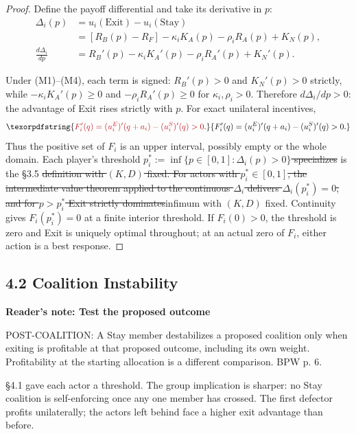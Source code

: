 \documentclass[12pt]{article}
\theoremstyle{definition}
\theoremstyle{remark}
\providecommand{\DIFaddtex}[1]{{\color{AddedText}#1}}
\providecommand{\DIFdeltex}[1]{{\color{DeletedText}\sout{#1}}}
\providecommand{\DIFaddbegin}{}
\providecommand{\DIFaddend}{}
\providecommand{\DIFdelbegin}{}
\providecommand{\DIFdelend}{}
\newcommand{\ReviewNote}[2]{\par\begin{mdframed}[backgroundcolor=blue!3,linecolor=NoteText,linewidth=0.6pt]\color{NoteText}\small\textbf{Reader's note: #1}\par #2\end{mdframed}\par}
\providecommand{\DIFadd}[1]{\texorpdfstring{\DIFaddtex{#1}}{#1}} %
\providecommand{\DIFdel}[1]{\texorpdfstring{\DIFdeltex{#1}}{}} %
\begin{document}
\begin{proof}
Define the payoff differential and take its derivative in $p$:
\begin{align*}
\Delta_i(p) &= u_i(\text{Exit}) - u_i(\text{Stay}) \\
            &= [R_B(p) - R_F] - \kappa_i K_A(p) - \rho_i R_A(p) + K_N(p), \\
\frac{d\Delta_i}{dp} &= R_B'(p) - \kappa_i K_A'(p) - \rho_i R_A'(p) + K_N'(p).
\end{align*}

Under (M1)--(M4), each term is signed: $R_B'(p) > 0$ and $K_N'(p) > 0$ strictly, while $-\kappa_i K_A'(p) \geq 0$ and $-\rho_i R_A'(p) \geq 0$ for $\kappa_i, \rho_i > 0$. Therefore $d\Delta_i/dp > 0$: the advantage of Exit rises strictly with $p$. \DIFaddbegin \DIFadd{For exact unilateral incentives,
}\[
 \DIFadd{F_i'(q)=(u_i^E)'(q+a_i)-(u_i^S)'(q)>0.
}\]
\DIFadd{Thus the positive set of $F_i$ is an upper interval, possibly empty or the whole domain. }\DIFaddend Each player's threshold \DIFdelbegin \DIFdel{$p_i^* := \inf\{p \in [0, 1] : \Delta_i(p) > 0\}$ specializes }\DIFdelend \DIFaddbegin \DIFadd{is }\DIFaddend the \S3.5 \DIFdelbegin \DIFdel{definition with $(K, D)$ fixed. For actors with $p_i^* \in [0, 1]$, the intermediate value theorem applied to the continuous $\Delta_i$ delivers $\Delta_i(p_i^*) = 0$, and for $p > p_i^*$ Exit strictly dominates}\DIFdelend \DIFaddbegin \DIFadd{infimum with $(K,D)$ fixed. Continuity gives $F_i(p_i^*)=0$ at a finite interior threshold. If $F_i(0)>0$, the threshold is zero and Exit is uniquely optimal throughout; at an actual zero of $F_i$, either action is a best response}\DIFaddend .

\end{proof}

\subsection{4.2 Coalition Instability}


\ReviewNote{Test the proposed outcome}{POST-COALITION: A Stay member destabilizes a proposed coalition only when exiting is profitable at that proposed outcome, including its own weight. Profitability at the starting allocation is a different comparison. BPW p. 6.}
\S4.1 gave each actor a threshold. The group implication is sharper: no Stay coalition is self-enforcing once any one member has crossed. The first defector profits unilaterally; the actors left behind face a higher exit advantage than before.
\end{document}
